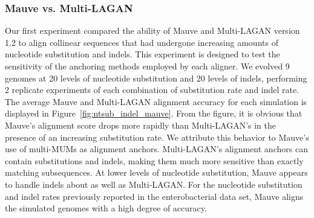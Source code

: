 \documentclass[titlepage,11pt]{article}
\begin{document}
\subsubsection*{Mauve vs. Multi-LAGAN}
Our first experiment compared the ability of Mauve and Multi-LAGAN version 1.2
to align collinear sequences that had undergone increasing amounts of
nucleotide substitution and indels.  This experiment is designed to test the
sensitivity of the anchoring methods employed by each aligner.  We evolved 
9 genomes at 20 levels of nucleotide substitution and 20 levels
of indels, performing 2 replicate experiments of each combination of
substitution rate and indel rate.  The average Mauve and Multi-LAGAN alignment
accuracy for each simulation is displayed in
Figure~\ref{fig:ntsub_indel_mauve}.  From the figure, it is obvious that
Mauve's alignment score drops more rapidly than Multi-LAGAN's in the presence
of an increasing substitution rate.  We attribute this behavior to Mauve's use
of multi-MUMs as alignment anchors.  Multi-LAGAN's alignment anchors can
contain substitutions and indels, making them much more sensitive than exactly
matching subsequences.  At lower levels of nucleotide substitution, Mauve
appears to handle indels about as well as Multi-LAGAN.  For the nucleotide
substitution and indel rates previously reported in the enterobacterial data
set, Mauve aligns the simulated genomes with a high degree of accuracy.

\end{document}
